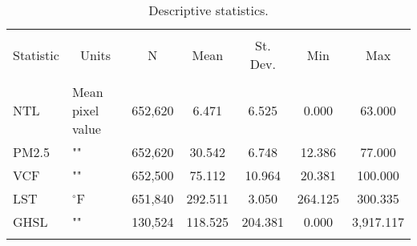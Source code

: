 
\begin{table}[H] \centering 
  \caption{Descriptive statistics.} 
  \label{tab:desc} 
\begin{tabular}{@{\extracolsep{5pt}}llccccc} 
\\[-1.8ex]\hline 
\hline \\[-1.8ex] 
Statistic & \multicolumn{1}{c}{Units} & \multicolumn{1}{c}{N} & \multicolumn{1}{c}{Mean} & \multicolumn{1}{c}{St. Dev.} & \multicolumn{1}{c}{Min} & \multicolumn{1}{c}{Max} \\ 
\hline \\[-1.8ex] 
NTL   &  Mean pixel value           & 652,620 & 6.471 & 6.525 & 0.000 & 63.000 \\ 
PM2.5 &  ""             & 652,620 & 30.542 & 6.748 & 12.386 & 77.000 \\ 
VCF   &  ""             & 652,500 & 75.112 & 10.964 & 20.381 & 100.000 \\ 
LST   & $^{\circ}$F &  651,840 & 292.511 & 3.050 & 264.125 & 300.335 \\ 
GHSL  &  ""             & 130,524 & 118.525 & 204.381 & 0.000 & 3,917.117 \\ 
\hline \\[-1.8ex] 
\end{tabular} 
\end{table} 
